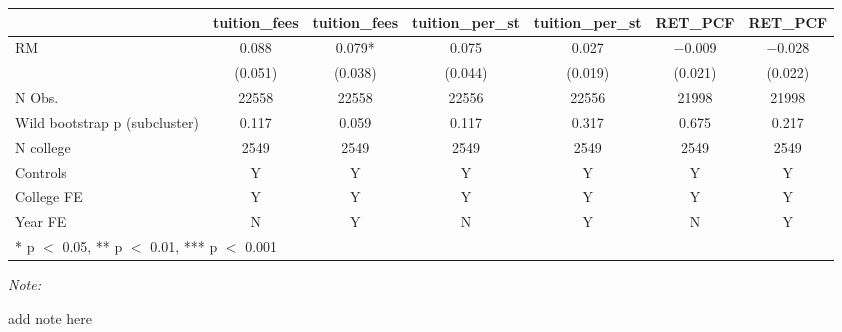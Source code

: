 \begin{table}
\centering
\begin{threeparttable}
\begin{tabular}[t]{lcccccc}
\toprule
  & tuition\_fees & tuition\_fees  & tuition\_per\_st & tuition\_per\_st  & RET\_PCF & RET\_PCF \\
\midrule
RM & \num{0.088} & \num{0.079}* & \num{0.075} & \num{0.027} & \num{-0.009} & \num{-0.028}\\
 & (\num{0.051}) & (\num{0.038}) & (\num{0.044}) & (\num{0.019}) & (\num{0.021}) & (\num{0.022})\\
\midrule
N Obs. & \num{22558} & \num{22558} & \num{22556} & \num{22556} & \num{21998} & \num{21998}\\
Wild bootstrap p (subcluster) & 0.117 & 0.059 & 0.117 & 0.317 & 0.675 & 0.217\\
N college & 2549 & 2549 & 2549 & 2549 & 2549 & 2549\\
Controls & Y & Y & Y & Y & Y & Y\\
College FE & Y & Y & Y & Y & Y & Y\\
Year FE & N & Y & N & Y & N & Y\\
\bottomrule
\multicolumn{7}{l}{\rule{0pt}{1em}* p $<$ 0.05, ** p $<$ 0.01, *** p $<$ 0.001}\\
\end{tabular}
\begin{tablenotes}
\item \textit{Note: } 
\item add note here
\end{tablenotes}
\end{threeparttable}
\end{table}
